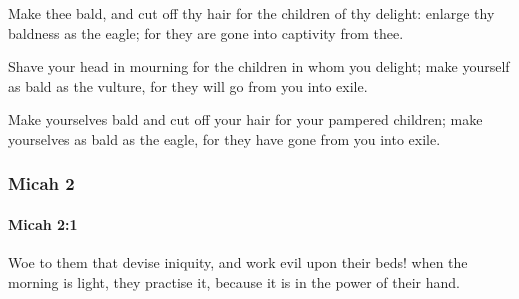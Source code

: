 			\begin{versebox}
					\item[BHS] 
					\item[LXX] 
					\item[ASV] Make thee bald, and cut off thy hair for the children of thy delight: enlarge thy baldness as the eagle; for they are gone into captivity from thee.
					\item[NIV] Shave your head in mourning for the children in whom you delight; make yourself as bald as the vulture, for they will go from you into exile.
					\item[NRSV] Make yourselves bald and cut off your hair for your pampered children; make yourselves as bald as the eagle, for they have gone from you into exile.
			\end{versebox}
	\subsubsection{Micah 2} %
		\label{MICAH-2}

		\paragraph{Micah 2:1} %
			\label{MICAH-2-1}

			Woe to them that devise iniquity, and work evil upon their beds! when the morning is light, they practise it, because it is in the power of their hand.

